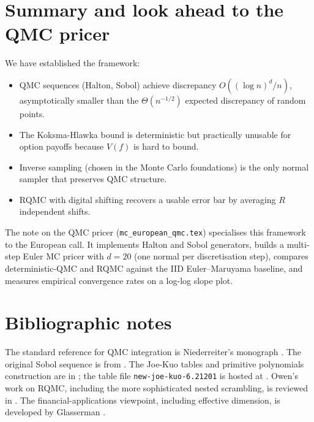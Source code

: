 \documentclass[11pt,a4paper]{article}
\theoremstyle{plain}
\theoremstyle{definition}
\theoremstyle{remark}
\begin{document}
\section{Summary and look ahead to the QMC pricer}
\label{sec:summary}

We have established the framework:
\begin{itemize}
\item QMC sequences (Halton, Sobol) achieve discrepancy $O((\log n)^d
/ n)$, asymptotically smaller than the $\Theta(n^{-1/2})$ expected
discrepancy of random points.
\item The Koksma-Hlawka bound is deterministic but practically
unusable for option payoffs because $V(f)$ is hard to bound.
\item Inverse sampling (chosen in the Monte Carlo foundations) is the
only normal sampler that preserves QMC structure.
\item RQMC with digital shifting recovers a usable error bar by
averaging $R$ independent shifts.
\end{itemize}

The note on the QMC pricer (\texttt{mc\_european\_qmc.tex}) specialises
this framework to the European call. It
implements Halton and Sobol generators, builds a multi-step Euler MC
pricer with $d = 20$ (one normal per discretisation step), compares
deterministic-QMC and RQMC against the IID Euler--Maruyama baseline,
and measures empirical convergence rates on a log-log slope plot.

\section{Bibliographic notes}
\label{sec:biblio}

The standard reference for QMC integration is Niederreiter's monograph
\cite{Niederreiter}. The original Sobol sequence is from
\cite{Sobol1967}. The Joe-Kuo tables and primitive polynomials
construction are in \cite{JoeKuo2008}; the table file
\texttt{new-joe-kuo-6.21201} is hosted at \cite{JoeKuoSite}.
Owen's work on RQMC, including the more sophisticated nested
scrambling, is reviewed in \cite{Owen2003}. The financial-applications
viewpoint, including effective dimension, is developed by Glasserman
\cite[Chapter~5]{Glasserman}.
\end{document}
